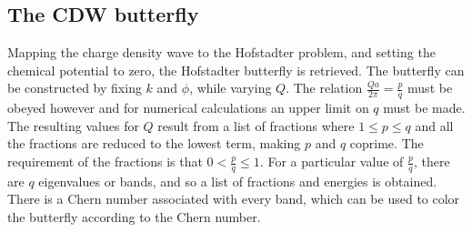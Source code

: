 \documentclass[letterpaper, 10 pt, conference]{ieeeconf}  %
\begin{document}
\subsection{The CDW butterfly}
Mapping the charge density wave to the Hofstadter problem, and setting the chemical potential to zero, the Hofstadter butterfly is retrieved.
The butterfly can be constructed by fixing $k$ and $\phi$, while varying $Q$.
The relation $\frac{Q a}{2 \pi} = \frac{p}{q}$ must be obeyed however and for numerical calculations an upper limit on $q$ must be made.
The resulting values for $Q$ result from a list of fractions where
$1 \leq p \leq q$ and all the fractions are reduced to the lowest term, making $p$ and $q$ coprime.
The requirement of the fractions is that
$0 < \frac{p}{q} \leq 1$.
For a particular value of $\frac{p}{q}$, there are $q$ eigenvalues or bands, and so a list of fractions and energies is obtained.
There is a Chern number associated with every band, which can be used to color the butterfly according to the Chern number.
\end{document}
